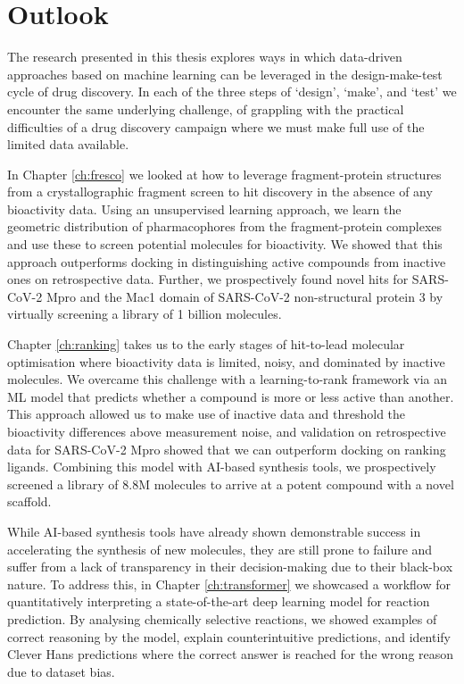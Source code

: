 \chapter{Outlook} \label{ch:outlook}

The research presented in this thesis explores ways in which data-driven approaches based on machine learning can be leveraged in the design-make-test cycle of drug discovery. In each of the three steps of `design', `make', and `test' we encounter the same underlying challenge, of grappling with the practical difficulties of a drug discovery campaign where we must make full use of the limited data available.

In Chapter \ref{ch:fresco} we looked at how to leverage fragment-protein structures from a crystallographic fragment screen to hit discovery in the absence of any bioactivity data. Using an unsupervised learning approach, we learn the geometric distribution of pharmacophores from the fragment-protein complexes and use these to screen potential molecules for bioactivity. We showed that this approach outperforms docking in distinguishing active compounds from inactive ones on retrospective data. Further, we prospectively found novel hits for SARS-CoV-2 Mpro and the Mac1 domain of SARS-CoV-2 non-structural protein 3 by virtually screening a library of 1 billion molecules.

Chapter \ref{ch:ranking} takes us to the early stages of hit-to-lead molecular optimisation where bioactivity data is limited, noisy, and dominated by inactive molecules. We overcame this challenge with a learning-to-rank framework via an ML model that predicts whether a compound is more or less active than another. This approach allowed us to make use of inactive data and threshold the bioactivity differences above measurement noise, and validation on retrospective data for SARS-CoV-2 Mpro showed that we can outperform docking on ranking ligands. Combining this model with AI-based synthesis tools, we prospectively screened a library of 8.8M molecules to arrive at a potent compound with a novel scaffold.

While AI-based synthesis tools have already shown demonstrable success in accelerating the synthesis of new molecules, they are still prone to failure and suffer from a lack of transparency in their decision-making due to their black-box nature. To address this, in Chapter \ref{ch:transformer} we showcased a workflow for quantitatively interpreting a state-of-the-art deep learning model for reaction prediction. By analysing chemically selective reactions, we showed examples of correct reasoning by the model, explain counterintuitive predictions, and identify Clever Hans predictions where the correct answer is reached for the wrong reason due to dataset bias.

